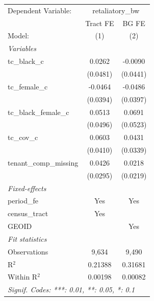 \begin{tabular}{lcc}
   \tabularnewline \midrule \midrule
   Dependent Variable: & \multicolumn{2}{c}{retaliatory\_bw}\\
                           & Tract FE & BG FE \\   
   Model:                  & (1)      & (2)\\  
   \midrule
   \emph{Variables}\\
   tc\_black\_c            & 0.0262   & -0.0090\\   
                           & (0.0481) & (0.0441)\\   
   tc\_female\_c           & -0.0464  & -0.0486\\   
                           & (0.0394) & (0.0397)\\   
   tc\_black\_female\_c    & 0.0513   & 0.0691\\   
                           & (0.0496) & (0.0523)\\   
   tc\_cov\_c              & 0.0603   & 0.0431\\   
                           & (0.0410) & (0.0339)\\   
   tenant\_comp\_missing   & 0.0426   & 0.0218\\   
                           & (0.0295) & (0.0219)\\   
   \midrule
   \emph{Fixed-effects}\\
   period\_fe              & Yes      & Yes\\  
   census\_tract           & Yes      & \\  
   GEOID                   &          & Yes\\  
   \midrule
   \emph{Fit statistics}\\
   Observations            & 9,634    & 9,490\\  
   R$^2$                   & 0.21388  & 0.31681\\  
   Within R$^2$            & 0.00198  & 0.00082\\  
   \midrule \midrule
   \multicolumn{3}{l}{\emph{Signif. Codes: ***: 0.01, **: 0.05, *: 0.1}}\\
\end{tabular}
\par\endgroup
\begingroup
\centering
